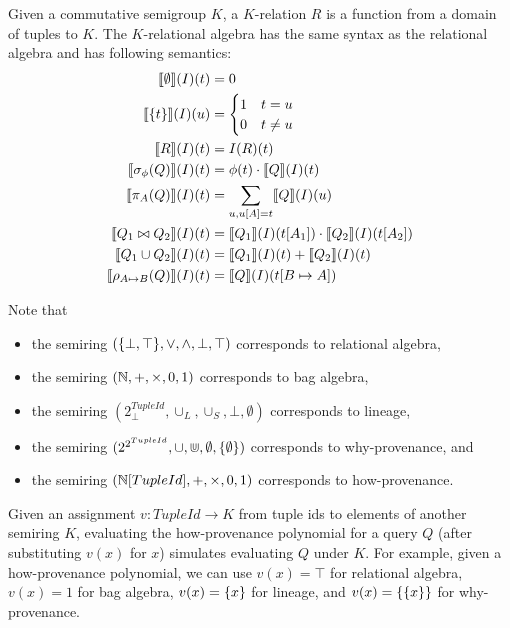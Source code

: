 \documentclass{mwhittaker}
\begin{document}
Given a commutative semigroup $K$, a $K$-relation $R$ is a function from a
domain of tuples to $K$. The $K$-relational algebra has the same syntax as the
relational algebra and has following semantics:
\begin{align*}
  \llbracket\emptyset\rrbracket(I)(t) &= 0 \\
  \llbracket\{t\}\rrbracket(I)(u) &= \begin{cases}
    1 & t = u \\
    0 & t \neq u
  \end{cases} \\
  \llbracket R\rrbracket(I)(t) &= I(R)(t) \\
  \llbracket\sigma_\phi(Q)\rrbracket(I)(t) &= \phi(t) \cdot \llbracket Q\rrbracket(I)(t) \\
  \llbracket\pi_A(Q)\rrbracket(I)(t) &= \sum_{u, u[A] = t} \llbracket Q\rrbracket(I)(u)\\
  \llbracket Q_1 \bowtie Q_2\rrbracket(I)(t) &= \llbracket Q_1\rrbracket(I)(t[A_1]) \cdot \llbracket Q_2\rrbracket(I)(t[A_2]) \\
  \llbracket Q_1 \cup Q_2\rrbracket(I)(t) &= \llbracket Q_1\rrbracket(I)(t) + \llbracket Q_2\rrbracket(I)(t) \\
  \llbracket\rho_{A \mapsto B}(Q)\rrbracket(I)(t) &= \llbracket Q\rrbracket(I)(t[B \mapsto A])
\end{align*}

Note that
\begin{itemize}
  \item
    the semiring $(\{\bot, \top\}, \lor, \land, \bot, \top)$ corresponds to
    relational algebra,
  \item
    the semiring $(\mathbb{N}, +, \times, 0, 1)$ corresponds to bag algebra,
  \item
    the semiring $(2^{TupleId}_\bot, \cup_L, \cup_S, \bot, \emptyset)$
    corresponds to lineage,
  \item
    the semiring $(2^{2^{TupleId}}, \cup, \Cup, \emptyset, \{\emptyset\})$
    corresponds to why-provenance, and
  \item
    the semiring $(\mathbb{N}[TupleId], +, \times, 0, 1)$ corresponds to
    how-provenance.
\end{itemize}

Given an assignment $v: TupleId \to K$ from tuple ids to elements of another
semiring $K$, evaluating the how-provenance polynomial for a query $Q$ (after
substituting $v(x)$ for $x$) simulates evaluating $Q$ under $K$. For example,
given a how-provenance polynomial, we can use $v(x) = \top$ for relational
algebra, $v(x) = 1$ for bag algebra, $v(x) = \{x\}$ for lineage, and $v(x) =
\{\{x\}\}$ for why-provenance.
\end{document}
